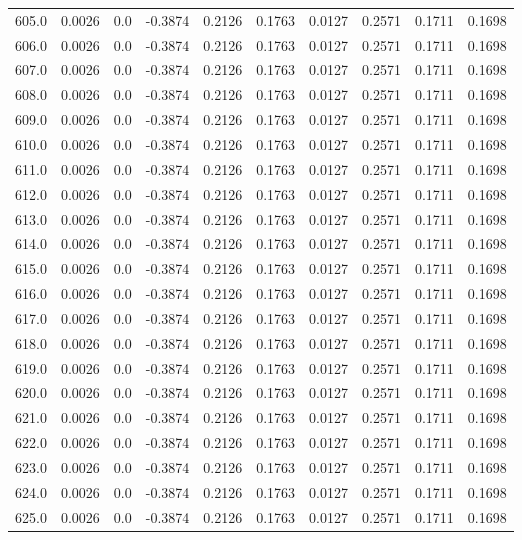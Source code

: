 \begin{longtable}{lrrrrrrrrr}
605.0 & 0.0026 & 0.0 & -0.3874 & 0.2126 & 0.1763 & 0.0127 & 0.2571 & 0.1711 & 0.1698 \\
606.0 & 0.0026 & 0.0 & -0.3874 & 0.2126 & 0.1763 & 0.0127 & 0.2571 & 0.1711 & 0.1698 \\
607.0 & 0.0026 & 0.0 & -0.3874 & 0.2126 & 0.1763 & 0.0127 & 0.2571 & 0.1711 & 0.1698 \\
608.0 & 0.0026 & 0.0 & -0.3874 & 0.2126 & 0.1763 & 0.0127 & 0.2571 & 0.1711 & 0.1698 \\
609.0 & 0.0026 & 0.0 & -0.3874 & 0.2126 & 0.1763 & 0.0127 & 0.2571 & 0.1711 & 0.1698 \\
610.0 & 0.0026 & 0.0 & -0.3874 & 0.2126 & 0.1763 & 0.0127 & 0.2571 & 0.1711 & 0.1698 \\
611.0 & 0.0026 & 0.0 & -0.3874 & 0.2126 & 0.1763 & 0.0127 & 0.2571 & 0.1711 & 0.1698 \\
612.0 & 0.0026 & 0.0 & -0.3874 & 0.2126 & 0.1763 & 0.0127 & 0.2571 & 0.1711 & 0.1698 \\
613.0 & 0.0026 & 0.0 & -0.3874 & 0.2126 & 0.1763 & 0.0127 & 0.2571 & 0.1711 & 0.1698 \\
614.0 & 0.0026 & 0.0 & -0.3874 & 0.2126 & 0.1763 & 0.0127 & 0.2571 & 0.1711 & 0.1698 \\
615.0 & 0.0026 & 0.0 & -0.3874 & 0.2126 & 0.1763 & 0.0127 & 0.2571 & 0.1711 & 0.1698 \\
616.0 & 0.0026 & 0.0 & -0.3874 & 0.2126 & 0.1763 & 0.0127 & 0.2571 & 0.1711 & 0.1698 \\
617.0 & 0.0026 & 0.0 & -0.3874 & 0.2126 & 0.1763 & 0.0127 & 0.2571 & 0.1711 & 0.1698 \\
618.0 & 0.0026 & 0.0 & -0.3874 & 0.2126 & 0.1763 & 0.0127 & 0.2571 & 0.1711 & 0.1698 \\
619.0 & 0.0026 & 0.0 & -0.3874 & 0.2126 & 0.1763 & 0.0127 & 0.2571 & 0.1711 & 0.1698 \\
620.0 & 0.0026 & 0.0 & -0.3874 & 0.2126 & 0.1763 & 0.0127 & 0.2571 & 0.1711 & 0.1698 \\
621.0 & 0.0026 & 0.0 & -0.3874 & 0.2126 & 0.1763 & 0.0127 & 0.2571 & 0.1711 & 0.1698 \\
622.0 & 0.0026 & 0.0 & -0.3874 & 0.2126 & 0.1763 & 0.0127 & 0.2571 & 0.1711 & 0.1698 \\
623.0 & 0.0026 & 0.0 & -0.3874 & 0.2126 & 0.1763 & 0.0127 & 0.2571 & 0.1711 & 0.1698 \\
624.0 & 0.0026 & 0.0 & -0.3874 & 0.2126 & 0.1763 & 0.0127 & 0.2571 & 0.1711 & 0.1698 \\
625.0 & 0.0026 & 0.0 & -0.3874 & 0.2126 & 0.1763 & 0.0127 & 0.2571 & 0.1711 & 0.1698 \\

\end{longtable}
